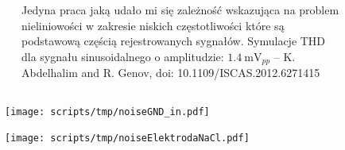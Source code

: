 \begin{frame}[t]
\begin{columns}
\begin{figure}[H]
    \end{figure}
        {\renewcommand\normalsize{\scriptsize}%
\normalsize
        Jedyna praca jaką udało mi się zależność wskazująca na problem nieliniowości w zakresie niskich częstotliwości które są podstawową częścią rejestrowanych sygnałów.
        Symulacje THD dla sygnału sinusoidalnego o amplitudzie: $\SI{1.4}{\milli\volt_{pp}}$ -- K. Abdelhalim and R. Genov, doi: 10.1109/ISCAS.2012.6271415}

\end{columns}



\end{frame}






\begin{frame}[t]
    \begin{block}{\dk}
    \end{block}
    \begin{figure}[H]
        \centering
        \begin{subfigure}[b]{0.485\textwidth}
            \centering
            \texttt{[image: scripts/tmp/noiseGND\_in.pdf]}
        \end{subfigure}
        \begin{subfigure}[b]{0.485\textwidth}
            \centering
            \texttt{[image: scripts/tmp/noiseElektrodaNaCl.pdf]}
        \end{subfigure}     
    \end{figure}
\end{frame}



